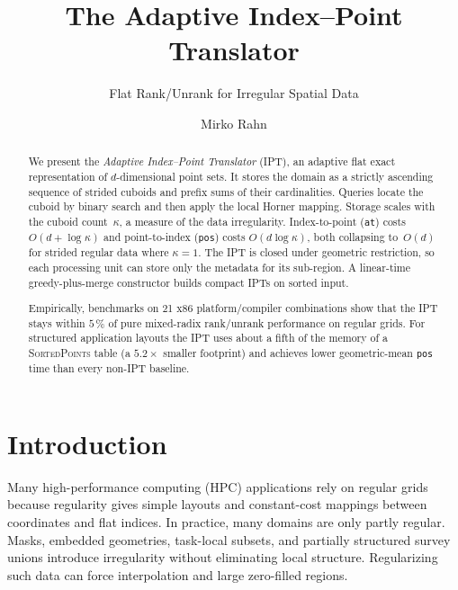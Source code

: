 \documentclass[manuscript,screen,review]{acmart}
\title[Adaptive Index--Point Translator]{The Adaptive Index--Point Translator}
\subtitle{Flat Rank/Unrank for Irregular Spatial Data}
\author{Mirko Rahn}
\affiliation{%
  \institution{Fraunhofer ITWM}
  \city{Kaiserslautern}
  \country{Germany}}
\theoremstyle{definition}
\theoremstyle{plain}
\begin{document}
\begin{abstract}
We present the \emph{Adaptive Index--Point Translator} (IPT), an
adaptive flat exact representation of $d$-dimensional point sets. It
stores the domain as a strictly ascending sequence of strided cuboids
and prefix sums of their cardinalities. Queries locate the cuboid by
binary search and then apply the local Horner mapping.  Storage scales
with the cuboid count~$\kappa$, a measure of the data
irregularity. Index-to-point (\texttt{at})
costs $O(d + \log\kappa)$ and point-to-index (\texttt{pos}) costs
$O(d\log\kappa)$, both collapsing to~$O(d)$ for strided regular data
where $\kappa=1$. The IPT is closed under geometric restriction, so
each processing unit can store only the metadata for its sub-region. A
linear-time greedy-plus-merge constructor builds compact IPTs on
sorted input.

Empirically, benchmarks on 21 x86 platform/compiler
combinations show that the IPT stays within $5\,\%$ of pure
mixed-radix rank/unrank performance on regular grids. For structured
application layouts the IPT uses about a fifth of the memory of a
\textsc{SortedPoints} table (a $5.2\times$ smaller footprint) and
achieves lower geometric-mean \texttt{pos} time than every non-IPT
baseline.
\end{abstract}



\maketitle

\section{Introduction}
\label{section:introduction}

Many high-performance computing (HPC) applications rely on regular
grids because regularity gives simple layouts and constant-cost
mappings between coordinates and flat indices. In practice, many
domains are only partly regular. Masks, embedded geometries,
task-local subsets, and partially structured survey unions introduce
irregularity without eliminating local structure. Regularizing such
data can force interpolation and large zero-filled regions.
\end{document}
